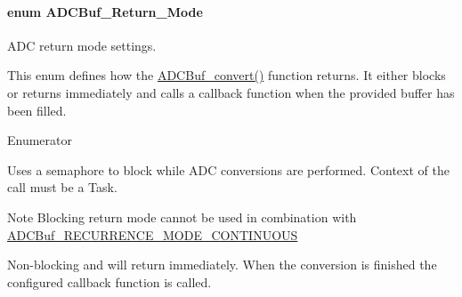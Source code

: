 \paragraph[{A\+D\+C\+Buf\+\_\+\+Return\+\_\+\+Mode}]{\setlength{\rightskip}{0pt plus 5cm}enum {\bf A\+D\+C\+Buf\+\_\+\+Return\+\_\+\+Mode}}\label{_a_d_c_buf_8h_a3d643e8024503c5ef2679c83419ba6ee}


A\+D\+C return mode settings. 

This enum defines how the \hyperlink{_a_d_c_buf_8h_a762253a94875258c5a71b591f03f9d97}{A\+D\+C\+Buf\+\_\+convert()} function returns. It either blocks or returns immediately and calls a callback function when the provided buffer has been filled. \begin{Desc}
\item[Enumerator]\par
\begin{description}
\item[{\em 
A\+D\+C\+Buf\+\_\+\+R\+E\+T\+U\+R\+N\+\_\+\+M\+O\+D\+E\+\_\+\+B\+L\+O\+C\+K\+I\+N\+G\label{_a_d_c_buf_8h_a3d643e8024503c5ef2679c83419ba6eea5c6236b2f629b196d7874175be679399}
}]Uses a semaphore to block while A\+D\+C conversions are performed. Context of the call must be a Task.

\begin{DoxyNote}{Note}
Blocking return mode cannot be used in combination with \hyperlink{_a_d_c_buf_8h_af15cc4961b02af48216132c2b8bc88f1ac10945188f88ddadd4322c4e117d5b3c}{A\+D\+C\+Buf\+\_\+\+R\+E\+C\+U\+R\+R\+E\+N\+C\+E\+\_\+\+M\+O\+D\+E\+\_\+\+C\+O\+N\+T\+I\+N\+U\+O\+U\+S} 
\end{DoxyNote}
\item[{\em 
A\+D\+C\+Buf\+\_\+\+R\+E\+T\+U\+R\+N\+\_\+\+M\+O\+D\+E\+\_\+\+C\+A\+L\+L\+B\+A\+C\+K\label{_a_d_c_buf_8h_a3d643e8024503c5ef2679c83419ba6eea633b4b063b88d7c62e9e2513075a36a7}
}]Non-\/blocking and will return immediately. When the conversion is finished the configured callback function is called. \end{description}
\end{Desc}


